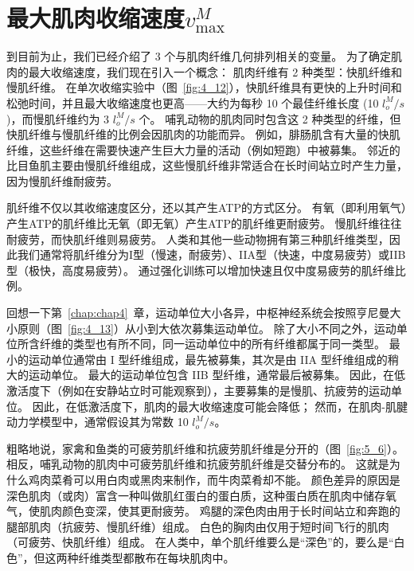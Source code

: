 \section{最大肌肉收缩速度$v_\text{max}^M$}

到目前为止，我们已经介绍了 3 个与肌肉纤维几何排列相关的变量。
为了确定肌肉的最大收缩速度，我们现在引入一个概念：
肌肉纤维有 2 种类型：快肌纤维和慢肌纤维。
在单次收缩实验中（图~\ref{fig:4_12}），快肌纤维具有更快的上升时间和松弛时间，并且最大收缩速度也更高——大约为每秒 10 个最佳纤维长度 (10 $l_o^M / s$)，而慢肌纤维约为 3 $l_o^M / s$ 个。
哺乳动物的肌肉同时包含这 2 种类型的纤维，但快肌纤维与慢肌纤维的比例会因肌肉的功能而异。
例如，腓肠肌含有大量的快肌纤维，这些纤维在需要快速产生巨大力量的活动（例如短跑）中被募集。
邻近的比目鱼肌主要由慢肌纤维组成，这些慢肌纤维非常适合在长时间站立时产生力量，因为慢肌纤维耐疲劳。


肌纤维不仅以其收缩速度区分，还以其产生ATP的方式区分。
有氧（即利用氧气）产生ATP的肌纤维比无氧（即无氧）产生ATP的肌纤维更耐疲劳。
慢肌纤维往往耐疲劳，而快肌纤维则易疲劳。
人类和其他一些动物拥有第三种肌纤维类型，因此我们通常将肌纤维分为I型（慢速，耐疲劳）、IIA型（快速，中度易疲劳）或IIB型（极快，高度易疲劳）。
通过强化训练可以增加快速且仅中度易疲劳的肌纤维比例。


回想一下第~\ref{chap:chap4}~章，运动单位大小各异，中枢神经系统会按照亨尼曼大小原则（图~\ref{fig:4_13}）从小到大依次募集运动单位。
除了大小不同之外，运动单位所含纤维的类型也有所不同，同一运动单位中的所有纤维都属于同一类型。
最小的运动单位通常由 I 型纤维组成，最先被募集，其次是由 IIA 型纤维组成的稍大的运动单位。
最大的运动单位包含 IIB 型纤维，通常最后被募集。
因此，在低激活度下（例如在安静站立时可能观察到），主要募集的是慢肌、抗疲劳的运动单位。
因此，在低激活度下，肌肉的最大收缩速度可能会降低；
然而，在肌肉-肌腱动力学模型中，通常假设其为常数 10 $l_o^M/s$。


粗略地说，家禽和鱼类的可疲劳肌纤维和抗疲劳肌纤维是分开的（图~\ref{fig:5_6}）。
相反，哺乳动物的肌肉中可疲劳肌纤维和抗疲劳肌纤维是交替分布的。
这就是为什么鸡肉菜肴可以用白肉或黑肉来制作，而牛肉菜肴却不能。
颜色差异的原因是深色肌肉（或肉）富含一种叫做肌红蛋白的蛋白质，这种蛋白质在肌肉中储存氧气，使肌肉颜色变深，使其更耐疲劳。
鸡腿的深色肉由用于长时间站立和奔跑的腿部肌肉（抗疲劳、慢肌纤维）组成。
白色的胸肉由仅用于短时间飞行的肌肉（可疲劳、快肌纤维）组成。
在人类中，单个肌纤维要么是“深色”的，要么是“白色”，但这两种纤维类型都散布在每块肌肉中。


